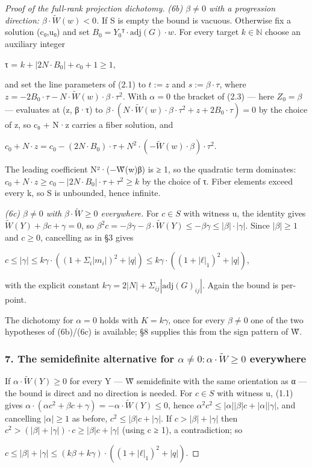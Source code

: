 \documentclass[11pt]{article}
\theoremstyle{plain}
\theoremstyle{definition}
\theoremstyle{remark}
\theoremstyle{plain}
\theoremstyle{definition}
\theoremstyle{remark}
\theoremstyle{plain}
\theoremstyle{definition}
\theoremstyle{remark}
\begin{document}
\begin{proof}[Proof of the full-rank projection dichotomy]
\emph{(6b) $β ≠ 0$ with a progression direction: $β·\tilde{W}(w) < 0$.} If S is empty the bound is vacuous. Otherwise fix a solution (c₀,u₀) and set $B_{0} = Y_{0}ᵀ·\mathrm{adj}(G)·w$. For every target $k ∈ ℕ$ choose an auxiliary integer

τ = $k + |2N·B_{0}| + c_{0} + 1 ≥ 1$,

and set the line parameters of (2.1) to $t := z$ and $s := β·τ$, where $z = −2B_{0}·τ − N·\tilde{W}(w)·β·τ^{2}$. With $α = 0$ the bracket of (2.3) — here $Z_{0} = β$ — evaluates at (z, β·τ) to $β·(N·\tilde{W}(w)·β·τ^{2} + z + 2B_{0}·τ) = 0$ by the choice of z, so c₀ + N·z carries a fiber solution, and

$c_{0} + N·z = c_{0} − (2N·B_{0})·τ + N^{2}·(−\tilde{W}(w)·β)·τ^{2}$.

The leading coefficient N²·(−W̃(w)β) is ≥ 1, so the quadratic term dominates: $c_{0} + N·z ≥ c_{0} − |2N·B_{0}|·τ + τ^{2} ≥ k$ by the choice of τ. Fiber elements exceed every k, so S is unbounded, hence infinite.

\emph{(6c) $β ≠ 0$ with $β·\tilde{W} ≥ 0$ everywhere.} For $c ∈ S$ with witness u, the identity gives $\tilde{W}(Y) + βc + γ = 0$, so $β^{2}c = −βγ − β·\tilde{W}(Y) ≤ −βγ ≤ |β|·|γ|$. Since $|β| ≥ 1$ and $c ≥ 0$, cancelling as in §3 gives

$c ≤ |γ| ≤ kγ·((1+Σ_{i}|m_{i}|)^{2}+|q|) ≤ kγ·((1+|ℓ|_{1})^{2}+|q|)$,

with the explicit constant $kγ = 2|N| + Σ_{ij}|\mathrm{adj}(G)_{ij}|$. Again the bound is per-point.

The dichotomy for $α = 0$ holds with $K = kγ$, once for every $β ≠ 0$ one of the two hypotheses of (6b)/(6c) is available; §8 supplies this from the sign pattern of W̃.

\subsubsection*{7. The semidefinite alternative for $α ≠ 0: α·\tilde{W} ≥ 0$ everywhere}
If $α·\tilde{W}(Y) ≥ 0$ for every Y — W̃ semidefinite with the same orientation as α — the bound is direct and no direction is needed. For $c ∈ S$ with witness u, (1.1) gives $α·(αc^{2} + βc + γ) = −α·\tilde{W}(Y) ≤ 0$, hence $α^{2}c^{2} ≤ |α||β|c + |α||γ|$, and cancelling $|α| ≥ 1$ as before, $c^{2} ≤ |β|c + |γ|$. If $c > |β| + |γ|$ then $c^{2} > (|β|+|γ|)·c ≥ |β|c + |γ|$ (using c ≥ 1), a contradiction; so

$c ≤ |β| + |γ| ≤ (kβ + kγ)·((1+|ℓ|_{1})^{2}+|q|)$.


\end{proof}
\end{document}
